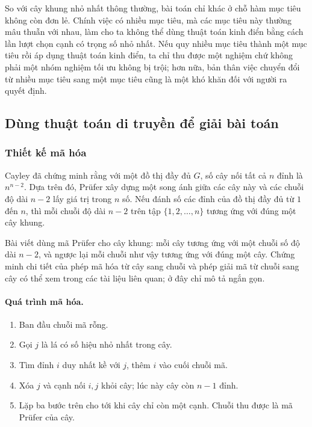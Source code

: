 \documentclass[11pt]{article}
\newcommand{\Pruefer}{Prüfer}
\begin{document}
So với cây khung nhỏ nhất thông thường, bài toán chỉ khác ở chỗ hàm mục tiêu
không còn đơn lẻ. Chính việc có nhiều mục tiêu, mà các mục tiêu này thường mâu
thuẫn với nhau, làm cho ta không thể dùng thuật toán kinh điển bằng cách lần
lượt chọn cạnh có trọng số nhỏ nhất. Nếu quy nhiều mục tiêu thành một mục tiêu
rồi áp dụng thuật toán kinh điển, ta chỉ thu được một nghiệm chứ không phải
một nhóm nghiệm tối ưu không bị trội; hơn nữa, bản thân việc chuyển đổi từ
nhiều mục tiêu sang một mục tiêu cũng là một khó khăn đối với người ra quyết
định.

\subsection{Dùng thuật toán di truyền để giải bài toán}

\subsubsection{Thiết kế mã hóa}

Cayley đã chứng minh rằng với một đồ thị đầy đủ \(G\), số cây nối tất cả \(n\)
đỉnh là \(n^{n-2}\). Dựa trên đó, \Pruefer{} xây dựng một song ánh giữa các
cây này và các chuỗi độ dài \(n-2\) lấy giá trị trong \(n\) số. Nếu đánh số
các đỉnh của đồ thị đầy đủ từ \(1\) đến \(n\), thì mỗi chuỗi độ dài \(n-2\)
trên tập \(\{1,2,\ldots,n\}\) tương ứng với đúng một cây khung.

Bài viết dùng mã \Pruefer{} cho cây khung: mỗi cây tương ứng với một chuỗi số
độ dài \(n-2\), và ngược lại mỗi chuỗi như vậy tương ứng với đúng một cây. Chứng
minh chi tiết của phép mã hóa từ cây sang chuỗi và phép giải mã từ chuỗi sang
cây có thể xem trong các tài liệu liên quan; ở đây chỉ mô tả ngắn gọn.

\paragraph{Quá trình mã hóa.}
\begin{enumerate}
  \item Ban đầu chuỗi mã rỗng.
  \item Gọi \(j\) là lá có số hiệu nhỏ nhất trong cây.
  \item Tìm đỉnh \(i\) duy nhất kề với \(j\), thêm \(i\) vào cuối chuỗi mã.
  \item Xóa \(j\) và cạnh nối \(i,j\) khỏi cây; lúc này cây còn \(n-1\) đỉnh.
  \item Lặp ba bước trên cho tới khi cây chỉ còn một cạnh. Chuỗi thu được là
  mã \Pruefer{} của cây.
\end{enumerate}
\end{document}
